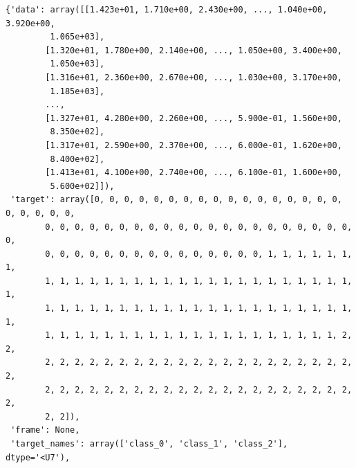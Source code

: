 \documentclass[
  letterpaper,
  DIV=11,
  numbers=noendperiod]{scrreprt}
\begin{document}
\begin{verbatim}
{'data': array([[1.423e+01, 1.710e+00, 2.430e+00, ..., 1.040e+00, 3.920e+00,
         1.065e+03],
        [1.320e+01, 1.780e+00, 2.140e+00, ..., 1.050e+00, 3.400e+00,
         1.050e+03],
        [1.316e+01, 2.360e+00, 2.670e+00, ..., 1.030e+00, 3.170e+00,
         1.185e+03],
        ...,
        [1.327e+01, 4.280e+00, 2.260e+00, ..., 5.900e-01, 1.560e+00,
         8.350e+02],
        [1.317e+01, 2.590e+00, 2.370e+00, ..., 6.000e-01, 1.620e+00,
         8.400e+02],
        [1.413e+01, 4.100e+00, 2.740e+00, ..., 6.100e-01, 1.600e+00,
         5.600e+02]]),
 'target': array([0, 0, 0, 0, 0, 0, 0, 0, 0, 0, 0, 0, 0, 0, 0, 0, 0, 0, 0, 0, 0, 0,
        0, 0, 0, 0, 0, 0, 0, 0, 0, 0, 0, 0, 0, 0, 0, 0, 0, 0, 0, 0, 0, 0,
        0, 0, 0, 0, 0, 0, 0, 0, 0, 0, 0, 0, 0, 0, 0, 1, 1, 1, 1, 1, 1, 1,
        1, 1, 1, 1, 1, 1, 1, 1, 1, 1, 1, 1, 1, 1, 1, 1, 1, 1, 1, 1, 1, 1,
        1, 1, 1, 1, 1, 1, 1, 1, 1, 1, 1, 1, 1, 1, 1, 1, 1, 1, 1, 1, 1, 1,
        1, 1, 1, 1, 1, 1, 1, 1, 1, 1, 1, 1, 1, 1, 1, 1, 1, 1, 1, 1, 2, 2,
        2, 2, 2, 2, 2, 2, 2, 2, 2, 2, 2, 2, 2, 2, 2, 2, 2, 2, 2, 2, 2, 2,
        2, 2, 2, 2, 2, 2, 2, 2, 2, 2, 2, 2, 2, 2, 2, 2, 2, 2, 2, 2, 2, 2,
        2, 2]),
 'frame': None,
 'target_names': array(['class_0', 'class_1', 'class_2'], dtype='<U7'),

\end{verbatim}
\end{document}

